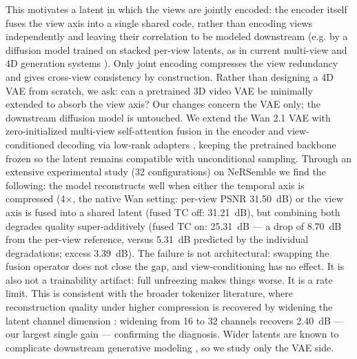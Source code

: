 This motivates a latent in which the views are jointly encoded: the encoder itself fuses the view axis into a single shared code, rather than encoding views independently and leaving their correlation to be modeled downstream (e.g. by a diffusion model trained on stacked per-view latents, as in current multi-view and 4D generation systems \cite{zuo2024videomv, xie2024sv4d}). Only joint encoding compresses the view redundancy and gives cross-view consistency by construction.
Rather than designing a 4D VAE from scratch, we ask: can a pretrained 3D video VAE be minimally extended to absorb the view axis? Our changes concern the VAE only; the downstream diffusion model is untouched. We extend the Wan 2.1 VAE \cite{wan2025wan} with
zero-initialized multi-view self-attention fusion in the encoder and view-conditioned decoding via low-rank adapters \cite{hu2022lora, zhang2023adding}, keeping the pretrained backbone frozen so the latent remains compatible with unconditional sampling.
Through an extensive experimental study (32 configurations) on NeRSemble \cite{kirschstein2023nersemble} we find the following: the model reconstructs well when either the temporal axis is compressed (4$\times$, the native Wan setting: per-view PSNR 31.50~dB) or the view axis is fused into a shared latent (fused TC off: 31.21~dB), but combining both degrades quality super-additively (fused TC on: 25.31~dB --- a drop of 8.70~dB from the per-view reference, versus 5.31~dB predicted by the individual degradations; excess 3.39~dB). The failure is not architectural: swapping the fusion operator does not close the gap, and view-conditioning has no effect. It is also not a trainability artifact: full unfreezing makes things worse. It is a rate limit. This is consistent with the broader tokenizer literature, where reconstruction quality under higher compression is recovered by widening the latent channel dimension \cite{dai2023emu, chen2024deep, hacohen2024ltx}: widening from 16 to 32 channels recovers 2.40~dB --- our largest single gain --- confirming the diagnosis. Wider latents are known to complicate downstream generative modeling \cite{yao2025vavae}, so we study only the VAE side.

